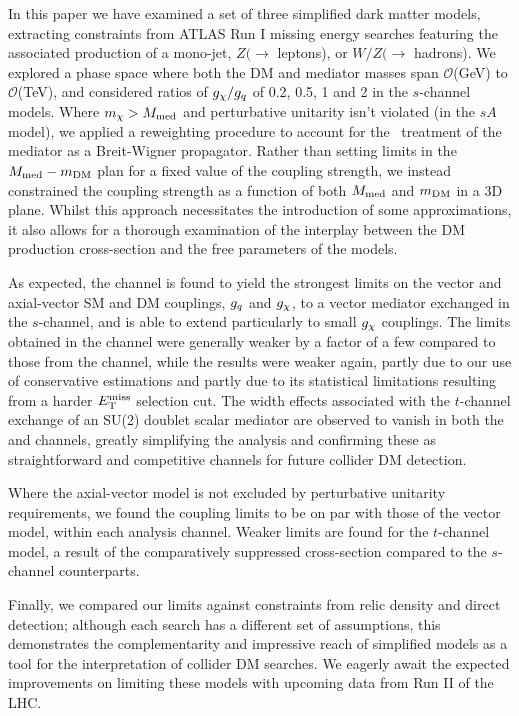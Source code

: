
In this paper we have examined a set of three simplified dark matter models, extracting constraints from ATLAS Run I missing energy searches featuring the associated production of a mono-jet, $Z(\rightarrow$ leptons), or $W/Z (\rightarrow$ hadrons). We explored a phase space where both the DM and mediator masses span $\mathcal{O}$(GeV) to $\mathcal{O}$(TeV), and considered ratios of $g_{\chi} / g_q$ of 0.2, 0.5, 1 and 2 in the $s$-channel models. Where $m_{\chi} > M_{\mathrm{med}}$ and perturbative unitarity isn't violated (in the $sA$ model), we applied a reweighting procedure to account for the \MG~treatment of the mediator as a Breit-Wigner propagator.  Rather than setting limits in the $M_{\mathrm{med}} - m_{\mathrm{DM}}$ plan for a fixed value of the coupling strength, we instead constrained the coupling strength as a function of both $M_{\mathrm{med}}$ and $m_{\mathrm{DM}}$ in a 3D plane. Whilst this approach necessitates the introduction of some approximations, it also allows for a thorough examination of the interplay between the DM production cross-section and the free parameters of the models.

As expected, the \monojet channel is found to yield the strongest limits on the vector and axial-vector SM and DM couplings, $g_q$ and $g_{\chi}$, to a vector mediator exchanged in the $s$-channel, and is able to extend particularly to small $g_{\chi}$ couplings. The limits obtained in the \monoZ channel were generally weaker by a factor of a few compared to those from the \monojet channel, while the \monoWZ results were weaker again, partly due to our use of conservative estimations and partly due to its statistical limitations resulting from a harder $E_{\mathrm{T}}^{\mathrm{miss}}$ selection cut. The width effects associated with the $t$-channel exchange of an SU(2) doublet scalar mediator are observed to vanish in both the \monoZ and \monoWZ channels, greatly simplifying the analysis and confirming these as straightforward and competitive channels for future collider DM detection. 

Where the axial-vector model is not excluded by perturbative unitarity requirements, we found the coupling limits to be on par with those of the vector model, within each analysis channel. Weaker limits are found for the $t$-channel model, a result of the comparatively suppressed cross-section compared to the $s$-channel counterparts. 

Finally, we compared our limits against constraints from relic density and direct detection; although each search has a different set of assumptions, this demonstrates the complementarity and impressive reach of simplified models as a tool for the interpretation of collider DM searches. We eagerly await the expected improvements on limiting these models with upcoming data from Run II of the LHC.

